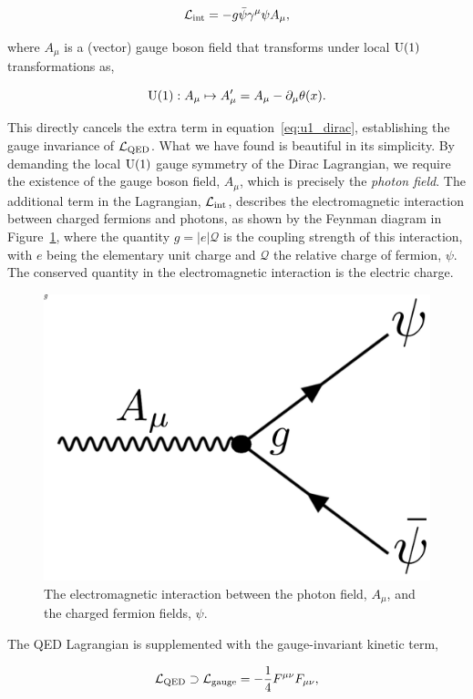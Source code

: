 \begin{equation}\label{eq:qed_interaction}
    \mathcal{L}_{\rm{int}} = -g\bar{\psi}\gamma^{\mu}{\psi}A_\mu,
\end{equation}

\noindent
where $A_\mu$ is a (vector) gauge boson field that transforms under local ${\rm{U}}(1)$ transformations as,

\begin{equation}
    {\rm{U}}(1): A_\mu \mapsto A_\mu' = A_\mu - {\partial_\mu\theta(x)}.
\end{equation}

\noindent
This directly cancels the extra term in equation~\ref{eq:u1_dirac}, establishing the gauge invariance of $\mathcal{L}_{\rm{QED}}$. What we have found is beautiful in its simplicity. By demanding the local ${\rm{U}}(1)$ gauge symmetry of the Dirac Lagrangian, we require the existence of the gauge boson field, $A_\mu$, which is precisely the \textit{photon field}. The additional term in the Lagrangian, $\mathcal{L}_{\rm{int}}$, describes the electromagnetic interaction between charged fermions and photons,
as shown by the Feynman diagram in Figure~\ref{fig:eminteraction}, where the quantity $g=|e|\mathcal{Q}$ is the coupling strength of this interaction, with $e$ being the elementary unit charge and $\mathcal{Q}$ the relative charge of fermion, $\psi$. The conserved quantity in the electromagnetic interaction is the electric charge.

\begin{figure}[htb!]
  \centering
  \includegraphics[width=.25\linewidth]{Figures/theory/em_interaction.pdf}
  \caption[The electromagnetic interaction]
  {
    The electromagnetic interaction between the photon field, $A_\mu$, and the charged fermion fields, $\psi$.
  }
  \label{fig:eminteraction}
\end{figure}

The QED Lagrangian is supplemented with the gauge-invariant kinetic term, 

\begin{equation}
    \mathcal{L}_{\rm{QED}} \supset \mathcal{L}_{\rm{gauge}} = -\frac{1}{4}F^{\mu\nu}F_{\mu\nu},
\end{equation}

